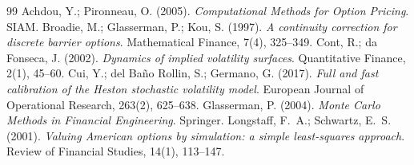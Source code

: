 \documentclass[11pt]{article}
\theoremstyle{plain}
\theoremstyle{definition}
\theoremstyle{remark}
\begin{document}
\begin{thebibliography}{99}
         Achdou, Y.; Pironneau, O. (2005). \emph{Computational Methods for Option Pricing}. SIAM.
     Broadie, M.; Glasserman, P.; Kou, S. (1997). \emph{A continuity correction for discrete barrier options}. Mathematical Finance, 7(4), 325--349.
             Cont, R.; da Fonseca, J. (2002). \emph{Dynamics of implied volatility surfaces}. Quantitative Finance, 2(1), 45--60.
                     Cui, Y.; del Ba\~no Rollin, S.; Germano, G. (2017). \emph{Full and fast calibration of the Heston stochastic volatility model}. European Journal of Operational Research, 263(2), 625--638.
              Glasserman, P. (2004). \emph{Monte Carlo Methods in Financial Engineering}. Springer.
       Longstaff, F.~A.; Schwartz, E.~S. (2001). \emph{Valuing American options by simulation: a simple least-squares approach}. Review of Financial Studies, 14(1), 113--147.
\end{thebibliography}
\end{document}
